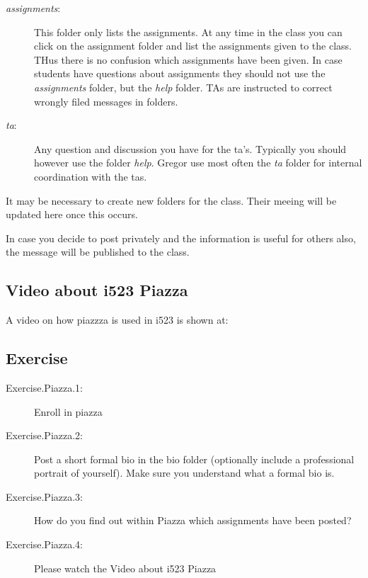 \begin{description}
\item[\emph{assignments}:]
This folder only lists the assignments. At any time in the class you can
click on the assignment folder and list the assignments given to the
class. THus there is no confusion which assignments have been given. In
case students have questions about assignments they should not use the
\emph{assignments} folder, but the \emph{help} folder. TAs are
instructed to correct wrongly filed messages in folders.
\item[\emph{ta}:]
Any question and discussion you have for the ta's. Typically you should
however use the folder \emph{help}. Gregor use most often the \emph{ta}
folder for internal coordination with the tas.
\end{description}

It may be necessary to create new folders for the class. Their meeing
will be updated here once this occurs.

In case you decide to post privately and the information is useful for
others also, the message will be published to the class.

\subsection{Video about i523 Piazza}

A video on how piazzza is used in i523 is shown at:


\subsection{Exercise}

\begin{description}
\item[Exercise.Piazza.1:] Enroll in piazza
\item[Exercise.Piazza.2:] Post a short formal bio in the bio folder
  (optionally include a professional portrait of yourself). Make sure
  you understand what a formal bio is.
\item[Exercise.Piazza.3:] How do you find out within Piazza which assignments
  have been posted?
\item[Exercise.Piazza.4:] Please watch the Video about i523 Piazza
\end{description}
